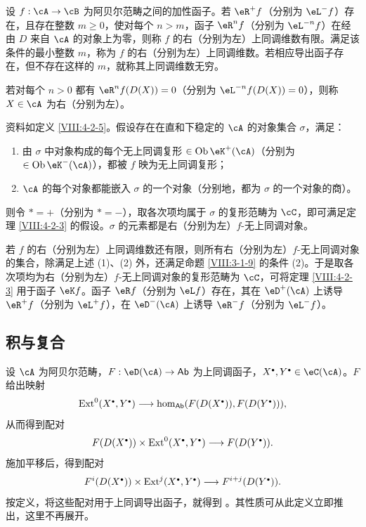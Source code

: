 \begin{definition}\label{VIII:4-2-5}
设 $f:\cA\to\cB$ 为阿贝尔范畴之间的加性函子。若 $\eR^+f$（分别为 $\eL^-f$）存在，且存在整数 $m\geq0$，使对每个 $n>m$，函子 $\eR^nf$（分别为 $\eL^{-n}f$）在经由 $D$ 来自 $\cA$ 的对象上为零，则称 $f$ 的右（分别为左）上同调维数有限。满足该条件的最小整数 $m$，称为 $f$ 的右（分别为左）上同调维数。若相应导出函子存在，但不存在这样的 $m$，就称其上同调维数无穷。

若对每个 $n>0$ 都有 $\eR^nf(D(X))=0$（分别为 $\eL^{-n}f(D(X))=0$），则称 $X\in\cA$ 为右（分别为左）。
\end{definition}
\begin{derivedcorollary}\label{VIII:4-2-3-2}
资料如定义 \ref{VIII:4-2-5}。假设存在在直和下稳定的 $\cA$ 的对象集合 $\sigma$，满足：
\begin{enumerate}
\item 由 $\sigma$ 中对象构成的每个无上同调复形 $\in\operatorname{Ob}\eK^+(\cA)$（分别为 $\in\operatorname{Ob}\eK^-(\cA)$），都被 $f$ 映为无上同调复形；
\item $\cA$ 的每个对象都能嵌入 $\sigma$ 的一个对象（分别地，都为 $\sigma$ 的一个对象的商）。
\end{enumerate}
则令 $\ast=+$（分别为 $\ast=-$），取各次项均属于 $\sigma$ 的复形范畴为 $\cC$，即可满足定理 \ref{VIII:4-2-3} 的假设。$\sigma$ 的元素都是右（分别为左）$f$-无上同调对象。

若 $f$ 的右（分别为左）上同调维数还有限，则所有右（分别为左）$f$-无上同调对象的集合，除满足上述 (1)、(2) 外，还满足命题 \ref{VIII:3-1-9} 的条件 (2)。于是取各次项均为右（分别为左）$f$-无上同调对象的复形范畴为 $\cC$，可将定理 \ref{VIII:4-2-3} 用于函子 $\eK f$。函子 $\eR f$（分别为 $\eL f$）存在，其在 $\eD^+(\cA)$ 上诱导 $\eR^+f$（分别为 $\eL^+f$），在 $\eD^-(\cA)$ 上诱导 $\eR^-f$（分别为 $\eL^-f$）。
\end{derivedcorollary}
\subsection{积与复合}\label{VIII:4-3}
设 $\cA$ 为阿贝尔范畴，$F:\eD(\cA)\to\mathsf{Ab}$ 为上同调函子，$X^\bullet,Y^\bullet\in\eC(\cA)$。$F$ 给出映射
\[
\ext^0(X^\bullet,Y^\bullet)\longrightarrow
\hom_{\mathsf{Ab}}(F(D(X^\bullet)),F(D(Y^\bullet))),
\]
从而得到配对
\[F(D(X^\bullet))\times\ext^0(X^\bullet,Y^\bullet)\longrightarrow F(D(Y^\bullet)).\]
施加平移后，得到配对
\[F^i(D(X^\bullet))\times\ext^j(X^\bullet,Y^\bullet)\longrightarrow F^{i+j}(D(Y^\bullet)).\]
按定义，将这些配对用于上同调导出函子，就得到 。其性质可从此定义立即推出，这里不再展开。

